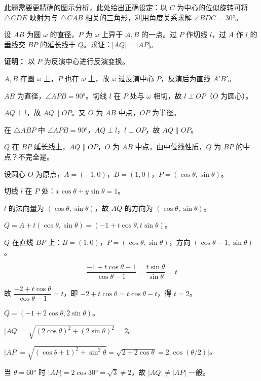 \documentclass[12pt, a4paper]{ctexart}
\begin{document}
此题需要更精确的图示分析，此处给出正确设定：以 $C$ 为中心的位似旋转可将 $\triangle CDE$ 映射为与 $\triangle CAB$ 相关的三角形，利用角度关系求解 $\angle BDC = 30°$。

\begin{examplebox}[【例题7】反演变换与调和点列]
设 $AB$ 为圆 $\omega$ 的直径，$P$ 为 $\omega$ 上异于 $A, B$ 的一点。过 $P$ 作切线 $l$，过 $A$ 作 $l$ 的垂线交 $BP$ 的延长线于 $Q$。求证：$|AQ| = |AP|$。
\end{examplebox}

\textbf{证明：} 以 $P$ 为反演中心进行反演变换。

$A, B$ 在圆 $\omega$ 上，$P$ 也在 $\omega$ 上，故 $\omega$ 过反演中心 $P$，反演后为直线 $A'B'$。

$AB$ 为直径，$\angle APB = 90°$。切线 $l$ 在 $P$ 处与 $\omega$ 相切，故 $l \perp OP$（$O$ 为圆心）。

$AQ \perp l$，故 $AQ \parallel OP$。又 $O$ 为 $AB$ 中点，$OP$ 为半径。

在 $\triangle ABP$ 中 $\angle APB = 90°$，$AQ \perp l$，$l \perp OP$，故 $AQ \parallel OP$。

$Q$ 在 $BP$ 延长线上，$AQ \parallel OP$，$O$ 为 $AB$ 中点，由中位线性质，$Q$ 为 $BP$ 的中点？不完全是。

设圆心 $O$ 为原点，$A = (-1, 0)$，$B = (1, 0)$，$P = (\cos\theta, \sin\theta)$。

切线 $l$ 在 $P$ 处：$x\cos\theta + y\sin\theta = 1$。

$l$ 的法向量为 $(\cos\theta, \sin\theta)$，故 $AQ$ 的方向为 $(\cos\theta, \sin\theta)$。

$Q = A + t(\cos\theta, \sin\theta) = (-1 + t\cos\theta, t\sin\theta)$。

$Q$ 在直线 $BP$ 上：$B = (1,0)$，$P = (\cos\theta, \sin\theta)$，方向 $(\cos\theta - 1, \sin\theta)$。

$$\frac{-1 + t\cos\theta - 1}{\cos\theta - 1} = \frac{t\sin\theta}{\sin\theta} = t$$

故 $\dfrac{-2 + t\cos\theta}{\cos\theta - 1} = t$，即 $-2 + t\cos\theta = t\cos\theta - t$，得 $t = 2$。

$Q = (-1 + 2\cos\theta, 2\sin\theta)$。

$|AQ| = \sqrt{(2\cos\theta)^2 + (2\sin\theta)^2} = 2$。

$|AP| = \sqrt{(\cos\theta + 1)^2 + \sin^2\theta} = \sqrt{2 + 2\cos\theta} = 2|\cos(\theta/2)|$。

当 $\theta = 60°$ 时 $|AP| = 2\cos 30° = \sqrt{3} \neq 2$，故 $|AQ| \neq |AP|$ 一般。
\end{document}
